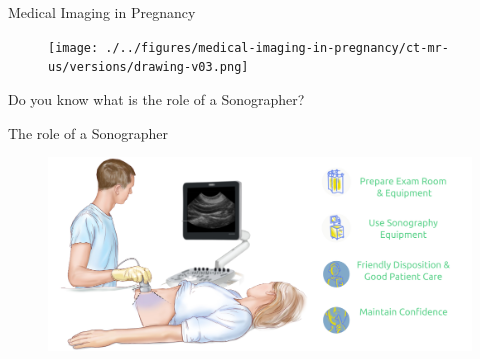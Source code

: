 
{
\begin{frame}{Medical Imaging in Pregnancy}
      \begin{figure}
        \centering
        \texttt{[image: ./../figures/medical-imaging-in-pregnancy/ct-mr-us/versions/drawing-v03.png]}
      \end{figure}
\end{frame}
}







{
\begin{frame}{}

\BigSizeFont
\begin{center}
    Do you know what is the role of a Sonographer?
\end{center}

\end{frame}
}



{
    \begin{frame}{The role of a Sonographer}
      \begin{figure}
        \centering
        \includegraphics[width=1.0\textwidth]{./../figures/sonographer/versions/drawing-v02.png}
      \end{figure}
\end{frame}
}
